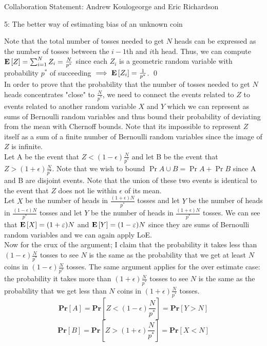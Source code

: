 \documentclass[12pt]{article}
\begin{document}

Collaboration Statement: Andrew Koulogeorge and Eric Richardson 

\begin{problem}{5: The better way of estimating bias of an unknown coin}
\end{problem}
\begin{solution} 
Note that the total number of tosses needed to get $N$ heads can be expressed as the number of tosses between the $i-1$th and $i$th head. Thus, we can compute $\mathbf{E}\left[Z\right] = \sum_{i=1}^{N}{Z_i} = \frac{N}{p^*}$ since each $Z_i$ is a geometric random variable with probability $p^*$ of succeeding $\implies \mathbf{E}\left[Z_i\right] = \frac{1}{p^*}$. \qed \\
In order to prove that the probability that the number of tosses needed to get $N$ heads concentrates "close" to $\frac{N}{p^*}$, we need to connect the events related to $Z$ to events related to another random variable $X$ and $Y$ which we can represent as sums of Bernoulli random variables and thus bound their probability of deviating from the mean with Chernoff bounds. Note that its impossible to represent $Z$ itself as a sum of a finite number of Bernoulli random variables since the image of $Z$ is infinite. \\

Let A be the event that $Z < (1-\epsilon)\frac{N}{p^*}$ and let B be the event that $Z > (1+\epsilon)\frac{N}{p^*}$. Note that we wish to bound $\Pr{A\cup B} = \Pr{A} + \Pr{B}$ since A and B are disjoint events. Note that the union of these two events is identical to the event that $Z$ does not lie within $\epsilon$ of its mean.\\

Let $X$ be the number of heads in $\frac{(1+ \epsilon)N}{p^*}$ tosses and let $Y$ be the number of heads in $\frac{(1-\epsilon)N}{p^*}$ tosses and let $Y$ be the number of heads in $\frac{(1+ \epsilon)N}{p^*}$ tosses. We can see that $\mathbf{E}\left[X\right] = (1+\varepsilon)N$ and $\mathbf{E}\left[Y\right] = (1-\varepsilon)N$ since they are sums of Bernoulli random variables and we can again apply LoE.\\

Now for the crux of the argument; I claim that the probability it takes less than $(1-\epsilon)\frac{N}{p^*}$ tosses to see $N$ is the same as the probability that we get at least $N$ coins in $(1-\epsilon)\frac{N}{p^*}$ tosses. The same argument applies for the over estimate case: the probability it takes more than $(1+\epsilon)\frac{N}{p^*}$ tosses to see $N$ is the same as the probability that we get less than $N$ coins in $(1+\epsilon)\frac{N}{p^*}$ tosses.
\[
\textbf{Pr}[A] = \textbf{Pr}[Z < (1-\epsilon)\frac{N}{p^*}] = \textbf{Pr}[Y > N]
\]
\[
\textbf{Pr}[B] = \textbf{Pr}[Z > (1+\epsilon)\frac{N}{p^*}] = \textbf{Pr}[X <  N]
\]


\end{solution}
\end{document}
